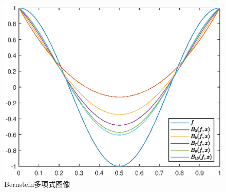 \begin{figure}[H]
	\centering
	\includegraphics[width = 0.6\linewidth]{day5/fig.eps}
	\caption{Bernstein多项式图像}
\end{figure}
